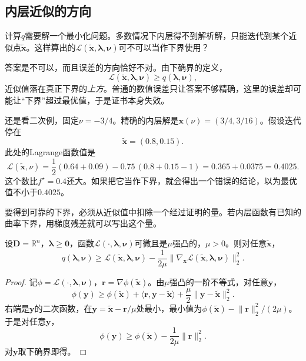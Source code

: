 \subsection{内层近似的方向}
\label{sec:dual-inexact-inner}

计算$q$需要解一个最小化问题。多数情况下内层得不到解析解，只能迭代到某个近似点$\tilde{\bm{x}}$。这样算出的$\mathcal{L}(\tilde{\bm{x}},\bm{\lambda},\bm{\nu})$可不可以当作下界使用？

答案是不可以，而且误差的方向恰好不对。由下确界的定义，
\[
 \mathcal{L}(\tilde{\bm{x}},\bm{\lambda},\bm{\nu})\geq q(\bm{\lambda},\bm{\nu}),
\]
近似值落在真正下界的\emph{上方}。普通的数值误差只让答案不够精确，这里的误差却可能让“下界”超过最优值，于是证书本身失效。

还是看二次例，固定$\nu=-3/4$。精确的内层解是$\bm{x}(\nu)=(3/4,3/16)$。假设迭代停在
\[
 \tilde{\bm{x}}=(0.8,0.15).
\]
此处的Lagrange函数值是
\[
 \mathcal{L}(\tilde{\bm{x}},\nu)=\frac12(0.64+0.09)-0.75\,(0.8+0.15-1)=0.365+0.0375=0.4025.
\]
这个数比$f^\star=0.4$还大。如果把它当作下界，就会得出一个错误的结论，以为最优值不小于$0.4025$。

要得到可靠的下界，必须从近似值中扣除一个经过证明的量。若内层函数有已知的曲率下界，用梯度残差就可以写出这个量。

\begin{lemma}[由梯度残差得到的认证下界]
 \label{lem:dual-certified-bound}
 设$\bm{D}=\mathbb{R}^n$，$\bm{\lambda}\geq\bm{0}$，函数$\mathcal{L}(\cdot,\bm{\lambda},\bm{\nu})$可微且是$\mu$强凸的，$\mu>0$。则对任意$\tilde{\bm{x}}$，
 \begin{equation}
  q(\bm{\lambda},\bm{\nu})\geq\mathcal{L}(\tilde{\bm{x}},\bm{\lambda},\bm{\nu})-\frac{1}{2\mu}\bigl\lVert\nabla_{\bm{x}}\mathcal{L}(\tilde{\bm{x}},\bm{\lambda},\bm{\nu})\bigr\rVert_2^2.
  \label{eq:dual-certified-bound}
 \end{equation}
\end{lemma}

\begin{proof}
 记$\phi=\mathcal{L}(\cdot,\bm{\lambda},\bm{\nu})$，$\bm{r}=\nabla\phi(\tilde{\bm{x}})$。由$\mu$强凸的一阶不等式，对任意$\bm{y}$，
 \[
  \phi(\bm{y})\geq\phi(\tilde{\bm{x}})+\langle\bm{r},\bm{y}-\tilde{\bm{x}}\rangle+\frac{\mu}{2}\lVert\bm{y}-\tilde{\bm{x}}\rVert_2^2.
 \]
 右端是$\bm{y}$的二次函数，在$\bm{y}=\tilde{\bm{x}}-\bm{r}/\mu$处最小，最小值为$\phi(\tilde{\bm{x}})-\lVert\bm{r}\rVert_2^2/(2\mu)$。于是对任意$\bm{y}$，
 \[
  \phi(\bm{y})\geq\phi(\tilde{\bm{x}})-\frac{1}{2\mu}\lVert\bm{r}\rVert_2^2.
 \]
 对$\bm{y}$取下确界即得。
\end{proof}

